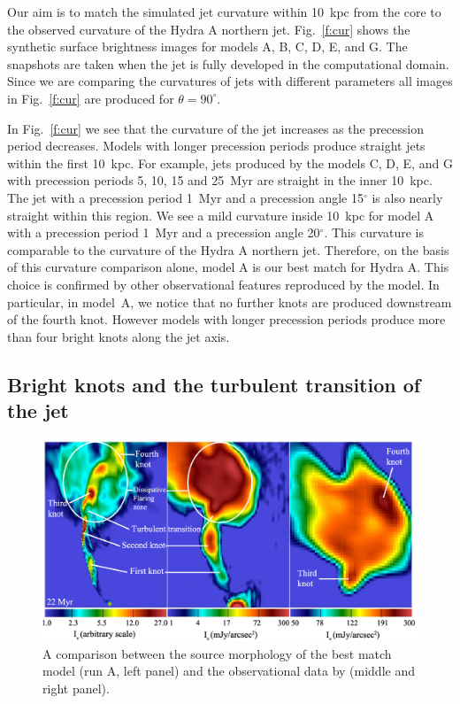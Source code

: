 \documentclass[useAMS, usenatbib]{mn2e}
\begin{document}
Our aim is to match the simulated jet curvature within 10~kpc from the core to the observed curvature of  the Hydra A northern jet. Fig.~\ref{f:cur} shows the synthetic surface brightness images for models A, B, C, D, E, and G. The snapshots are taken when the jet is fully developed in the computational domain.
Since we are comparing the curvatures of jets with different parameters all images in Fig.~\ref{f:cur} are produced for $\theta = 90^{\circ}$.

In Fig.~\ref{f:cur} we see that the curvature of the jet increases as the precession period decreases. Models with longer precession periods produce straight jets within the first 10~kpc. For example, jets produced by the models C, D, E, and G with precession periods 5, 10, 15 and 25~Myr are straight in the inner 10~kpc. The jet with a precession period 1~Myr and a precession angle 15$^{\circ}$ is also nearly straight within this region. We see a mild curvature inside 10~kpc for model A with a precession period 1~Myr and a precession angle 20$^{\circ}$. This curvature is comparable to the curvature of the Hydra A northern jet. Therefore, on the basis of this curvature comparison alone, model A is our best match for Hydra A. This choice is confirmed by other observational features reproduced by the model. In particular, in model~A, we notice that no further knots are produced downstream of the fourth knot. However models with longer precession periods produce more than four bright knots along the jet axis. 

\subsection{Bright knots and the turbulent transition of the jet}
\begin{figure}
\centering
\includegraphics[width=\textwidth]{fig5.eps}
\caption{ A comparison between the source morphology of the best match model (run A, left panel) and the observational data by \citet{taylor90} (middle and right panel).}
\label{f:hyd}
\end{figure}
\end{document}
